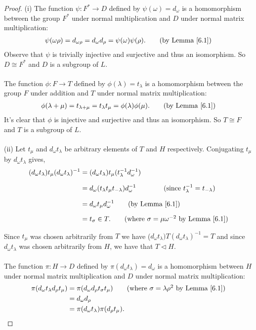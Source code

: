 \documentclass[a4paper , 11pt]{book}
\theoremstyle{definition}
\theoremstyle{remark}
\begin{document}
\begin{proof} 
(i) The function $\psi: F^* \rightarrow D$ defined by $\psi(\omega) = d_\omega$ is a homomorphism between the group $F^*$ under normal multiplication and $D$ under normal matrix multiplication:
\begin{align*} \psi(\omega \rho) = d_{\omega \rho} =  d_\omega d_\rho = \psi(\omega) \psi(\rho). \tag{by Lemma \ref{6.1}}
\end{align*}
Observe that $\psi$ is trivially injective and surjective and thus an isomorphism. So $D\cong F^*$ and $D$ is a subgroup of $L$.\\
\\
 The function $\phi: F \rightarrow T$ defined by $\phi(\lambda) = t_\lambda$ is a homomorphism between the group $F$ under addition and $T$ under normal matrix multiplication:
\begin{align*} \phi(\lambda + \mu) = t_{\lambda + \mu} = t_\lambda t_\mu = \phi(\lambda) \phi(\mu). \tag{by Lemma \ref{6.1}}
\end{align*}
It's clear that $\phi$ is injective and surjective and thus an isomorphism. So $ T \cong F$ and $T$ is a subgroup of $L$. \\
\\
(ii) Let $t_\mu$ and $d_\omega t_\lambda$ be arbitrary elements of $T$ and $H$ respectively. Conjugating $t_\mu$ by $d_\omega t_\lambda$ gives,
\begin{align*} (d_\omega t_\lambda) t_\mu (d_\omega t_\lambda)^{-1} &= (d_\omega t_\lambda) t_\mu (t^{-1}_\lambda d^{-1}_\omega) \\[1.5ex]
&=
d_\omega (t_\lambda t_\mu t_{-\lambda}) d^{-1}_\omega \qquad \tag{since $t^{-1}_\lambda=t_{-\lambda}$} \\[1.5ex] 
&=
d_\omega t_\mu d^{-1}_\omega \tag{by Lemma \ref{6.1}} \\[1.5ex] 
&= t_\sigma \in T. \tag{where $\sigma = \mu \omega^{-2}$ by Lemma \ref{6.1}}
\end{align*}

Since $t_\mu$ was chosen arbitrarily from $T$ we have ($d_\omega t_\lambda) T (d_\omega t_\lambda)^{-1} = T$ and since $d_\omega t_\lambda$ was chosen arbitrarily from $H$, we have that $T \vartriangleleft H$. \\
\\
The function $\pi: H \rightarrow D$ defined by $\pi(d_\omega t_\lambda) = d_\omega$ is a homomorphism between $H$ under normal matrix multiplication and $D$ under normal matrix multiplication:
\begin{align*} \pi(d_\omega t_\lambda d_\rho t_\mu) &= \pi(d_\omega d_\rho t_\sigma t_\mu) \tag{where $\sigma = \lambda \rho^{2}$ by Lemma \ref{6.1}}
\\ &= d_\omega d_\rho
\\ &= \pi(d_\omega t_\lambda)\pi(d_\rho t_\mu).
\end{align*}


\end{proof}
\end{document}
